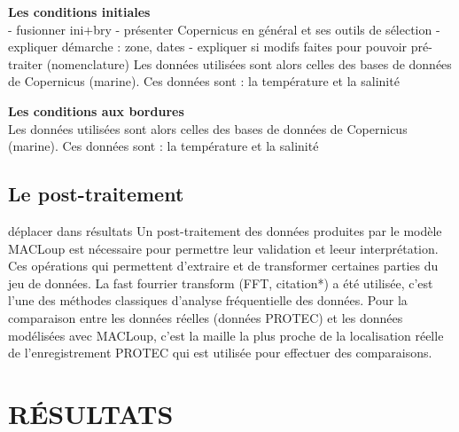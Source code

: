 \documentclass[10pt,a4paper,titlepage]{article}
\begin{document}
\textbf{Les conditions initiales}\\
\label{par:cond_init}
\alert{
    - fusionner ini+bry
    - présenter Copernicus en général et ses outils de sélection
    - expliquer démarche : zone, dates
    - expliquer si modifs faites pour pouvoir pré-traiter (nomenclature)
}
Les données utilisées sont alors celles des bases de données de Copernicus (marine).
Ces données sont : la température et la salinité %


\textbf{Les conditions aux bordures}\\
\label{par:cond_bords}
Les données utilisées sont alors celles des bases de données de Copernicus (marine).
Ces données sont : la température et la salinité %


\subsection{Le post-traitement}
\label{sub:postpro}
\alert{déplacer dans résultats}
Un post-traitement des données produites par le modèle MACLoup est nécessaire pour permettre leur validation et leeur interprétation.
Ces opérations qui permettent d'extraire et de transformer certaines parties du jeu de données.
La fast fourrier transform (FFT, \alert{citation*}) a été utilisée, c'est l'une des méthodes classiques d'analyse fréquentielle des données.
Pour la comparaison entre les données réelles (données PROTEC) et les données modélisées avec MACLoup, c'est la maille la plus proche de la localisation réelle de l'enregistrement PROTEC qui est utilisée pour effectuer des comparaisons.



\newpage
\section{RÉSULTATS}
\label{sec:resultats}
\end{document}
